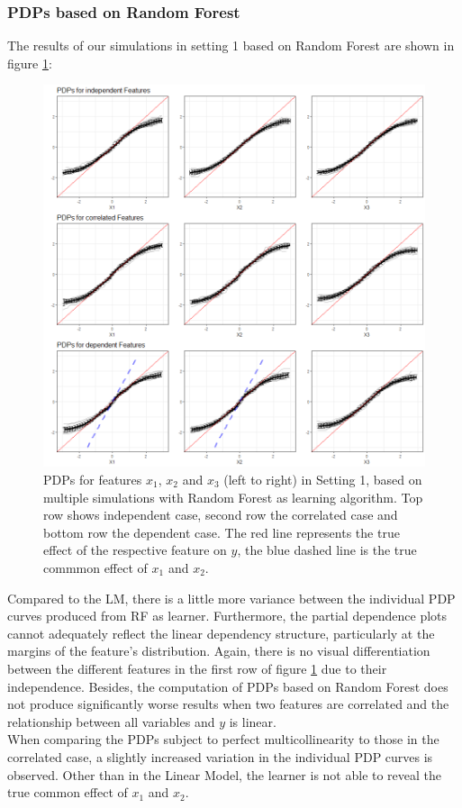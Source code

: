 \documentclass[]{krantz}
\begin{document}
\subsubsection{PDPs based on Random
Forest}\label{pdps-based-on-random-forest}

The results of our simulations in setting 1 based on Random Forest are
shown in figure \ref{fig:Figure15}:

\begin{figure}

\includegraphics[width=1\linewidth]{images/VK_PDP_15_Set1_RF} \hfill{}

\caption{PDPs for features $x_1$, $x_2$ and $x_3$ (left to right) in Setting 1, based on multiple simulations with Random Forest as learning algorithm. Top row shows independent case, second row the correlated case and bottom row the dependent case. The red line represents the true effect of the respective feature on $y$, the blue dashed line is the true commmon effect of $x_1$ and $x_2$.}\label{fig:Figure15}
\end{figure}

Compared to the LM, there is a little more variance between the
individual PDP curves produced from RF as learner. Furthermore, the
partial dependence plots cannot adequately reflect the linear dependency
structure, particularly at the margins of the feature's distribution.
Again, there is no visual differentiation between the different features
in the first row of figure \ref{fig:Figure15} due to their independence.
Besides, the computation of PDPs based on Random Forest does not produce
significantly worse results when two features are correlated and the
relationship between all variables and \(y\) is linear.\\
When comparing the PDPs subject to perfect multicollinearity to those in
the correlated case, a slightly increased variation in the individual
PDP curves is observed. Other than in the Linear Model, the learner is
not able to reveal the true common effect of \(x_1\) and \(x_2\).
\end{document}
